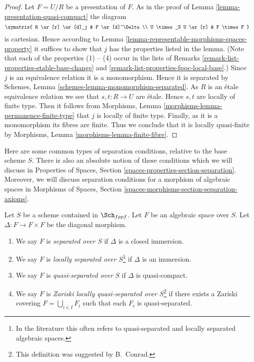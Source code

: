 \begin{proof}
Let $F = U/R$ be a presentation of $F$.
As in the proof of Lemma \ref{lemma-presentation-quasi-compact} the diagram
$$
\xymatrix{
R \ar[r] \ar[d]_j & F \ar[d]^\Delta \\
U \times_S U \ar[r] & F \times F
}
$$
is cartesian. Hence according to
Lemma \ref{lemma-representable-morphisms-spaces-property}
it suffices to show that $j$ has the properties listed in the lemma.
(Note that each of the properties (1) -- (4) occur in the lists
of Remarks \ref{remark-list-properties-stable-base-change}
and \ref{remark-list-properties-fpqc-local-base}.)
Since $j$ is an equivalence relation it is a monomorphism.
Hence it is separated by
Schemes, Lemma \ref{schemes-lemma-monomorphism-separated}.
As $R$ is an \'etale equivalence relation we see that
$s, t : R \to U$ are \'etale. Hence $s, t$ are locally of finite
type. Then it follows from
Morphisms, Lemma \ref{morphisms-lemma-permanence-finite-type} that
$j$ is locally of finite type. Finally, as it is a monomorphism
its fibres are finite. Thus we conclude that it is locally quasi-finite by
Morphisms, Lemma \ref{morphisms-lemma-finite-fibre}.
\end{proof}

\noindent
Here are some common types of separation conditions, relative to the base
scheme $S$. There is also an absolute notion of these conditions which we
will discuss in
Properties of Spaces, Section \ref{spaces-properties-section-separation}.
Moreover, we will discuss separation conditions for a morphism of
algebraic spaces in
Morphisms of Spaces, Section \ref{spaces-morphisms-section-separation-axioms}.

\begin{definition}
\label{definition-separated}
Let $S$ be a scheme contained in $\Sch_{fppf}$.
Let $F$ be an algebraic space over $S$.
Let $\Delta : F \to F \times F$ be the diagonal morphism.
\begin{enumerate}
\item We say $F$ is {\it separated over $S$} if $\Delta$ is a closed immersion.
\item We say $F$ is {\it locally separated over $S$}\footnote{In the
literature this often refers to quasi-separated and
locally separated algebraic spaces.} if $\Delta$ is an
immersion.
\item We say $F$ is {\it quasi-separated over $S$} if $\Delta$ is quasi-compact.
\item We say $F$ is {\it Zariski locally quasi-separated over $S$}\footnote{This
definition was suggested by B.\ Conrad.} if there
exists a Zariski covering $F = \bigcup_{i \in I} F_i$ such that
each $F_i$ is quasi-separated.
\end{enumerate}
\end{definition}

